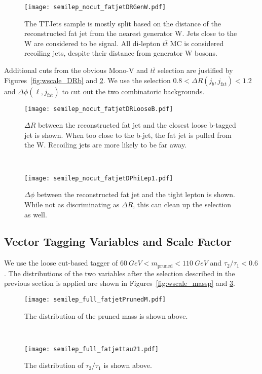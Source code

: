 \documentclass{article}
\begin{document}
\begin{figure}[h]
  \centering
  \texttt{[image: semilep\_nocut\_fatjetDRGenW.pdf]}
  \caption{The TTJets sample is mostly split based on the distance of the reconstructed fat jet
  from the nearest generator W. Jets close to the W are considered to be signal.
  All di-lepton $t\bar{t}$ MC is considered recoiling jets, despite their distance from generator W bosons.}
  \label{fig:wscale_DRGen}
\end{figure}

Additional cuts from the obvious Mono-V and $t\bar{t}$ selection are 
justified by Figures~\ref{fig:wscale_DRb} and \ref{fig:wscale_DPhiLep}.
We use the selection $0.8 < \Delta R(j_b,j_\text{fat}) < 1.2$ 
and $\Delta\phi(\ell,j_\text{fat})$ to cut out the two combinatoric backgrounds.

\begin{figure}[h]
  \centering
  \begin{minipage}{0.49\linewidth}
    \centering
    \texttt{[image: semilep\_nocut\_fatjetDRLooseB.pdf]}
    \caption{$\Delta R$ between the reconstructed fat jet and the closest loose
    b-tagged jet is shown. When too close to the b-jet, the fat jet is pulled from
    the W. Recoiling jets are more likely to be far away.}
    \label{fig:wscale_DRb}
  \end{minipage}
  ~
  \begin{minipage}{0.49\linewidth}
    \centering
    \texttt{[image: semilep\_nocut\_fatjetDPhiLep1.pdf]}
    \caption{$\Delta\phi$ between the reconstructed fat jet and the tight lepton
      is shown. While not as discriminating as $\Delta R$, this can clean up the selection
      as well.}
    \label{fig:wscale_DPhiLep}
  \end{minipage}
\end{figure}
  
\subsection{Vector Tagging Variables and Scale Factor} \label{sec:wscale_tagging}

We use the loose cut-based tagger of $\SI{60}{GeV} < m_\text{pruned} < \SI{110}{GeV}$
and $\tau_2/\tau_1 < 0.6$.
The distributions of the two variables after the selection described
in the previous section is applied are shown in
Figures~\ref{fig:wscale_massp} and \ref{fig:wscale_tau21}.

\begin{figure}[h]
  \centering
  \begin{minipage}{0.49\linewidth}
    \centering
    \texttt{[image: semilep\_full\_fatjetPrunedM.pdf]}
    \caption{The distribution of the pruned mass is shown above.}
    \label{fig:wscale_massp}
  \end{minipage}
  ~
  \begin{minipage}{0.49\linewidth}
    \centering
    \texttt{[image: semilep\_full\_fatjettau21.pdf]}
    \caption{The distribution of $\tau_2/\tau_1$ is shown above.}
    \label{fig:wscale_tau21}
  \end{minipage}
\end{figure}
  
\end{document}
